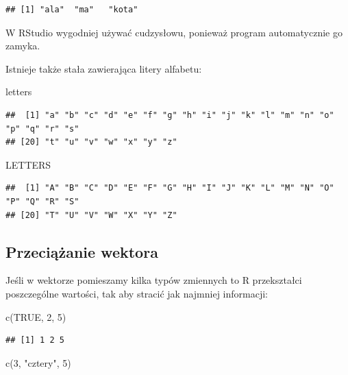 \documentclass[
]{book}
\newenvironment{Shaded}{\begin{snugshade}}{\end{snugshade}}
\newcommand{\ConstantTok}[1]{\textcolor[rgb]{0.00,0.00,0.00}{#1}}
\newcommand{\DecValTok}[1]{\textcolor[rgb]{0.00,0.00,0.81}{#1}}
\newcommand{\FunctionTok}[1]{\textcolor[rgb]{0.00,0.00,0.00}{#1}}
\newcommand{\NormalTok}[1]{#1}
\newcommand{\StringTok}[1]{\textcolor[rgb]{0.31,0.60,0.02}{#1}}
\begin{document}
\begin{verbatim}
## [1] "ala"  "ma"   "kota"
\end{verbatim}

W RStudio wygodniej używać cudzysłowu, ponieważ program automatycznie go zamyka.

Istnieje także stała zawierająca litery alfabetu:

\begin{Shaded}
\begin{Highlighting}[]
\NormalTok{letters}
\end{Highlighting}
\end{Shaded}

\begin{verbatim}
##  [1] "a" "b" "c" "d" "e" "f" "g" "h" "i" "j" "k" "l" "m" "n" "o" "p" "q" "r" "s"
## [20] "t" "u" "v" "w" "x" "y" "z"
\end{verbatim}

\begin{Shaded}
\begin{Highlighting}[]
\NormalTok{LETTERS}
\end{Highlighting}
\end{Shaded}

\begin{verbatim}
##  [1] "A" "B" "C" "D" "E" "F" "G" "H" "I" "J" "K" "L" "M" "N" "O" "P" "Q" "R" "S"
## [20] "T" "U" "V" "W" "X" "Y" "Z"
\end{verbatim}

\hypertarget{przeciux105ux17canie-wektora}{%
\subsection{Przeciążanie wektora}\label{przeciux105ux17canie-wektora}}

Jeśli w wektorze pomieszamy kilka typów zmiennych to R przekształci poszczególne wartości, tak aby stracić jak najmniej informacji:

\begin{Shaded}
\begin{Highlighting}[]
\FunctionTok{c}\NormalTok{(}\ConstantTok{TRUE}\NormalTok{, }\DecValTok{2}\NormalTok{, }\DecValTok{5}\NormalTok{)}
\end{Highlighting}
\end{Shaded}

\begin{verbatim}
## [1] 1 2 5
\end{verbatim}

\begin{Shaded}
\begin{Highlighting}[]
\FunctionTok{c}\NormalTok{(}\DecValTok{3}\NormalTok{, }\StringTok{"cztery"}\NormalTok{, }\DecValTok{5}\NormalTok{)}
\end{Highlighting}
\end{Shaded}
\end{document}
